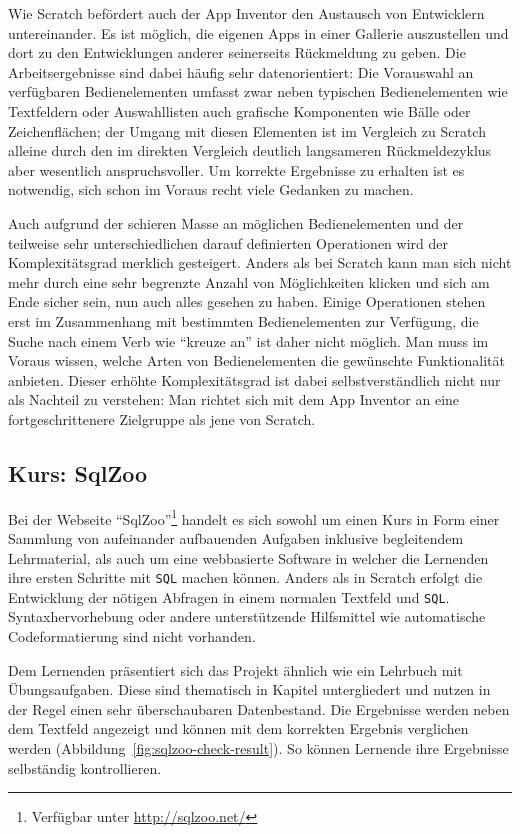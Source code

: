 Wie Scratch befördert auch der App Inventor den Austausch von Entwicklern untereinander. Es ist möglich, die eigenen Apps in einer Gallerie auszustellen und dort zu den Entwicklungen anderer seinerseits Rückmeldung zu geben. Die Arbeitsergebnisse sind dabei häufig sehr datenorientiert: Die Vorauswahl an verfügbaren Bedienelementen umfasst zwar neben typischen Bedienelementen wie Textfeldern oder Auswahllisten auch grafische Komponenten wie Bälle oder Zeichenflächen; der Umgang mit diesen Elementen ist im Vergleich zu Scratch alleine durch den im direkten Vergleich deutlich langsameren Rückmeldezyklus aber wesentlich anspruchsvoller. Um korrekte Ergebnisse zu erhalten ist es notwendig, sich schon im Voraus recht viele Gedanken zu machen.

Auch aufgrund der schieren Masse an möglichen Bedienelementen und der teilweise sehr unterschiedlichen darauf definierten Operationen wird der Komplexitätsgrad merklich gesteigert. Anders als bei Scratch kann man sich nicht mehr durch eine sehr begrenzte Anzahl von Möglichkeiten klicken und sich am Ende sicher sein, nun auch alles gesehen zu haben. Einige Operationen stehen erst im Zusammenhang mit bestimmten Bedienelementen zur Verfügung, die Suche nach einem Verb wie "`kreuze an"' ist daher nicht möglich. Man muss im Voraus wissen, welche Arten von Bedienelementen die gewünschte Funktionalität anbieten.  Dieser erhöhte Komplexitätsgrad ist dabei selbstverständlich nicht nur als Nachteil zu verstehen: Man richtet sich mit dem App Inventor an eine fortgeschrittenere Zielgruppe als jene von Scratch.

\subsection{Kurs: SqlZoo}

Bei der Webseite "`SqlZoo"'\footnote{Verfügbar unter \url{http://sqlzoo.net/}} handelt es sich sowohl um einen Kurs in Form einer Sammlung von aufeinander aufbauenden Aufgaben inklusive begleitendem Lehrmaterial, als auch um eine webbasierte Software in welcher die Lernenden ihre ersten Schritte mit \texttt{SQL} machen können. Anders als in Scratch erfolgt die Entwicklung der nötigen Abfragen in einem normalen Textfeld und \texttt{SQL}. Syntaxhervorhebung oder andere unterstützende Hilfsmittel wie automatische Codeformatierung sind nicht vorhanden.

Dem Lernenden präsentiert sich das Projekt ähnlich wie ein Lehrbuch mit Übungsaufgaben. Diese sind thematisch in Kapitel untergliedert und nutzen in der Regel einen sehr überschaubaren Datenbestand. Die Ergebnisse werden neben dem Textfeld angezeigt und können mit dem korrekten Ergebnis verglichen werden (Abbildung~\ref{fig:sqlzoo-check-result}). So können Lernende ihre Ergebnisse selbständig kontrollieren.

